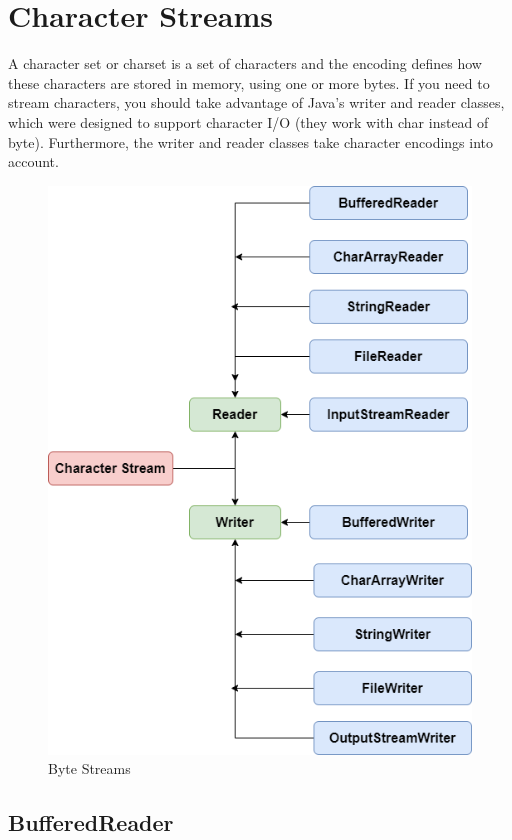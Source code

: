 \section{Character Streams}

A character set or charset is a set of characters and the encoding defines how these characters are stored in memory,  using one or more bytes.
If you need to stream characters, you should take advantage of Java’s writer and reader classes, which were designed to support character I/O (they work with char instead of byte). Furthermore, the writer and reader classes take character encodings into account.


\begin{figure}[H]
  \includegraphics[width=\linewidth]{images/file_io/character_stream_classes.png}
  \caption{Byte Streams}
  \label{fig:paths}
\end{figure}


\subsection{BufferedReader}

